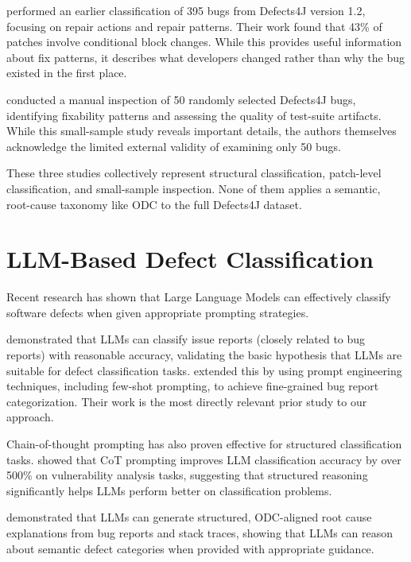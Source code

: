 \documentclass{iutbscthesis}
\begin{document}
\textcite{sobreira2018dissection} performed an earlier classification of 395 bugs from Defects4J version 1.2, focusing on repair actions and repair patterns. Their work found that 43\% of patches involve conditional block changes. While this provides useful information about fix patterns, it describes what developers changed rather than why the bug existed in the first place.

\textcite{xuan2017better} conducted a manual inspection of 50 randomly selected Defects4J bugs, identifying fixability patterns and assessing the quality of test-suite artifacts. While this small-sample study reveals important details, the authors themselves acknowledge the limited external validity of examining only 50 bugs.

These three studies collectively represent structural classification, patch-level classification, and small-sample inspection. None of them applies a semantic, root-cause taxonomy like ODC to the full Defects4J dataset.

\section{LLM-Based Defect Classification}

Recent research has shown that Large Language Models can effectively classify software defects when given appropriate prompting strategies.

\textcite{colavito2024llm} demonstrated that LLMs can classify issue reports (closely related to bug reports) with reasonable accuracy, validating the basic hypothesis that LLMs are suitable for defect classification tasks. \textcite{koyuncu2025exploring} extended this by using prompt engineering techniques, including few-shot prompting, to achieve fine-grained bug report categorization. Their work is the most directly relevant prior study to our approach.

Chain-of-thought prompting has also proven effective for structured classification tasks. \textcite{nong2024cot} showed that CoT prompting improves LLM classification accuracy by over 500\% on vulnerability analysis tasks, suggesting that structured reasoning significantly helps LLMs perform better on classification problems.

\textcite{gao2024rcegen} demonstrated that LLMs can generate structured, ODC-aligned root cause explanations from bug reports and stack traces, showing that LLMs can reason about semantic defect categories when provided with appropriate guidance.
\end{document}

